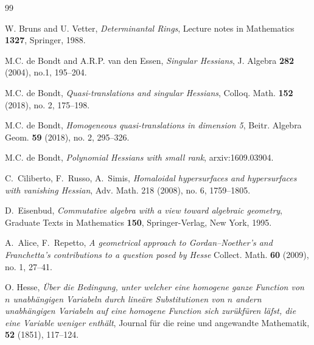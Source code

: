 \documentclass[12pt]{article}
\theoremstyle{definition}
\theoremstyle{remark}
\begin{document}
\begin{thebibliography}{99}


W. Bruns and U. Vetter, 
{\it Determinantal Rings}, 
Lecture notes in Mathematics {\bf 1327}, Springer,  1988.   


M.C. de Bondt and A.R.P. van den Essen, {\it Singular Hessians}, J. Algebra \textbf{282} (2004), 
no.\@ 1, 195--204. 

M.C. de Bondt, {\it Quasi-translations and singular Hessians}, Colloq. Math. \textbf{152} (2018),
no. 2, 175--198.

M.C. de Bondt, {\it Homogeneous quasi-translations in dimension 5}, Beitr. Algebra Geom. 
\textbf{59} (2018), no. 2, 295--326. 

M.C. de Bondt, {\it Polynomial Hessians with small rank}, arxiv:1609.03904.


 C.\ Ciliberto,  F.\  Russo, A.\ Simis,  
{\it Homaloidal hypersurfaces and hypersurfaces with vanishing Hessian},
Adv. Math. 218 (2008), no. 6, 1759--1805.   

D.\ Eisenbud, 
{\it Commutative algebra with a view toward algebraic geometry}, Graduate 
Texts in Mathematics {\bf 150}, Springer-Verlag, New York, 1995. 


A.\ Alice, F.\ Repetto, 
{\it A geometrical approach to Gordan--Noether's and Franchetta's contributions 
to a question posed by Hesse} 
Collect. Math. \textbf{60} (2009), no. 1, 27--41. 



O. Hesse, {\it \"Uber  die Bedingung, unter welcher eine homogene ganze Function von $n$ 
unabh\"angigen Variabeln durch line\"are Substitutionen von $n$ andern unabh\"angigen 
Variabeln auf eine homogene Function sich  zur\"ukf\"uren l\"afst,
die eine Variable weniger enth\"alt}, 
Journal f\"ur die reine und angewandte Mathematik, 
 {\bf 52} (1851), 117--124. 


\end{thebibliography}
\end{document}
